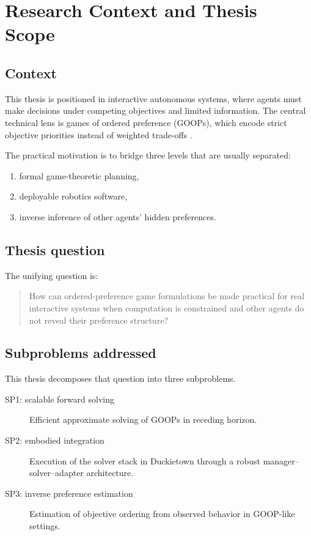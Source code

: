 \chapter{Research Context and Thesis Scope}

\section{Context}

This thesis is positioned in interactive autonomous systems, where agents must
make decisions under competing objectives and limited information. The central
technical lens is games of ordered preference (GOOPs), which encode strict
objective priorities instead of weighted trade-offs \cite{lee:2025,zanardi:2022}.

The practical motivation is to bridge three levels that are usually separated:

\begin{enumerate}
    \item formal game-theoretic planning,
    \item deployable robotics software,
    \item inverse inference of other agents' hidden preferences.
\end{enumerate}

\section{Thesis question}

The unifying question is:

\begin{quote}
How can ordered-preference game formulations be made practical for real
interactive systems when computation is constrained and other agents do not
reveal their preference structure?
\end{quote}

\section{Subproblems addressed}

This thesis decomposes that question into three subproblems.

\begin{description}
    \item[SP1: scalable forward solving] Efficient approximate solving of GOOPs
    in receding horizon.
    \item[SP2: embodied integration] Execution of the solver stack in
    Duckietown through a robust manager--solver--adapter architecture.
    \item[SP3: inverse preference estimation] Estimation of objective ordering
    from observed behavior in GOOP-like settings.
\end{description}

